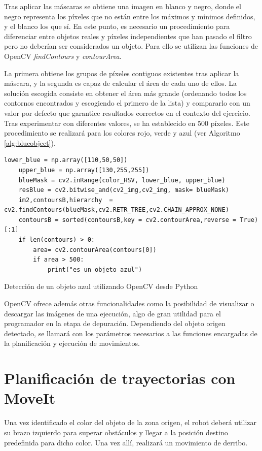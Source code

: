 \documentclass[12pt,spanish,chapterprefix, numbers=noenddot]{book}
\numberwithin{equation}{section}
\numberwithin{figure}{section}
\begin{document}
Tras aplicar las máscaras se obtiene una imagen en blanco y negro, donde el negro representa los píxeles que no están entre los máximos y mínimos definidos, y el blanco los que sí. En este punto, es necesario un procedimiento para diferenciar entre objetos reales y píxeles independientes que han pasado el filtro pero no deberían ser considerados un objeto. Para ello se utilizan las funciones de OpenCV \textit{findContours} y \textit{contourArea}. 

La primera obtiene los grupos de píxeles contiguos existentes tras aplicar la máscara, y la segunda es capaz de calcular el área de cada uno de ellos. La solución escogida consiste en obtener el área más grande (ordenando todos los contornos encontrados y escogiendo el primero de la lista) y compararlo con un valor por defecto que garantice resultados correctos en el contexto del ejercicio. Tras experimentar con diferentes valores, se ha establecido en 500 píxeles. Este procedimiento se realizará para los colores rojo, verde y azul (ver Algoritmo \ref{alg:blueobject}).

\begin{algorithm}[htb!]
    \begin{lstlisting}[frame=single] 
    lower_blue = np.array([110,50,50])
    upper_blue = np.array([130,255,255])
    blueMask = cv2.inRange(color_HSV, lower_blue, upper_blue)
    resBlue = cv2.bitwise_and(cv2_img,cv2_img, mask= blueMask)
    im2,contoursB,hierarchy  = cv2.findContours(blueMask,cv2.RETR_TREE,cv2.CHAIN_APPROX_NONE)
    contoursB = sorted(contoursB,key = cv2.contourArea,reverse = True)[:1] 
    if len(contours) > 0:
        area= cv2.contourArea(contours[0])
        if area > 500:
            print("es un objeto azul")
    \end{lstlisting}
\caption{\label{alg:blueobject}Detección de un objeto azul utilizando OpenCV desde Python}
\end{algorithm}

OpenCV ofrece además otras funcionalidades como la posibilidad de visualizar o descargar las imágenes de una ejecución, algo de gran utilidad para el programador en la etapa de depuración. 
Dependiendo del objeto origen detectado, se llamará con los parámetros necesarios a las funciones encargadas de la planificación y ejecución de movimientos.

\section{Planificación de trayectorias con MoveIt}
Una vez identificado el color del objeto de la zona origen, el robot deberá utilizar su brazo izquierdo para superar obstáculos y llegar a la posición destino predefinida para dicho color. Una vez allí, realizará un movimiento de derribo. 
\end{document}
